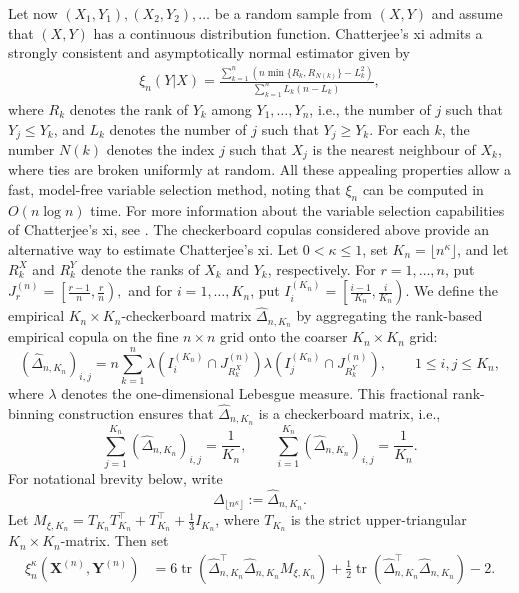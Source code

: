 \documentclass{article}
\theoremstyle{definition}
\DeclareMathOperator{\tr}{tr}  %
\newcommand{\bsX}{\boldsymbol{X}}
\newcommand{\bsY}{\boldsymbol{Y}}
\begin{document}
Let now $(X_1, Y_1), (X_2, Y_2), \ldots$ be a random sample from $(X,Y)$ and assume that $(X,Y)$ has a continuous distribution function.
Chatterjee's xi admits a strongly consistent and asymptotically normal estimator given by
\begin{align}\label{estTn}
    \xi_n(Y|X) = \frac{\sum_{k=1}^n (n \min\{R_k,R_{N(k)}\}-L_k^2)}{\sum_{k=1}^n L_k (n-L_k)},
\end{align}
where $R_k$ denotes the rank of $Y_k$ among $Y_1,\ldots,Y_n$, i.e., the number of $j$ such that $Y_j\leq Y_k$, and $L_k$ denotes the number of $j$ such that $Y_j\geq Y_k$.
For each $k$, the number $N(k)$ denotes the index $j$ such that $X_j$ is the nearest neighbour of $X_k$, where ties are broken uniformly at random.
All these appealing properties allow a fast, model-free variable selection method, noting that $\xi_n$ can be computed in $O(n\log n)$ time.
For more information about the variable selection capabilities of Chatterjee's xi, see \cite{chatterjee2021,huang2022kernel,ansari2024empirical}.
The checkerboard copulas considered above provide an alternative way to estimate Chatterjee's xi.
Let \(0<\kappa\le 1\), set \(K_n=\lfloor n^\kappa\rfloor\), and let \(R_k^X\) and \(R_k^Y\) denote the ranks of \(X_k\) and \(Y_k\), respectively.
For \(r=1,\ldots,n\), put
\(
    J_r^{(n)}=\left[\frac{r-1}{n},\frac{r}{n}\right),
\)
and for \(i=1,\ldots,K_n\), put
\(
    I_i^{(K_n)}=\left[\frac{i-1}{K_n},\frac{i}{K_n}\right).
\)
We define the empirical \(K_n\times K_n\)-checkerboard matrix \(\widehat\Delta_{n,K_n}\) by aggregating the rank-based empirical copula on the fine \(n\times n\) grid onto the coarser \(K_n\times K_n\) grid:
\[
    \left(\widehat\Delta_{n,K_n}\right)_{i,j}
    =
    n\sum_{k=1}^n
    \lambda\!\left(I_i^{(K_n)}\cap J_{R_k^X}^{(n)}\right)
    \lambda\!\left(I_j^{(K_n)}\cap J_{R_k^Y}^{(n)}\right),
    \qquad 1\le i,j\le K_n,
\]
where \(\lambda\) denotes the one-dimensional Lebesgue measure.
This fractional rank-binning construction ensures that \(\widehat\Delta_{n,K_n}\) is a checkerboard matrix, i.e.,
\[
    \sum_{j=1}^{K_n}\left(\widehat\Delta_{n,K_n}\right)_{i,j}
    =
    \frac1{K_n},
    \qquad
    \sum_{i=1}^{K_n}\left(\widehat\Delta_{n,K_n}\right)_{i,j}
    =
    \frac1{K_n}.
\]
For notational brevity below, write
\[
    \Delta_{\lfloor n^\kappa\rfloor}:=\widehat\Delta_{n,K_n}.
\]
Let \(M_{\xi,K_n}=T_{K_n}T_{K_n}^\top+T_{K_n}^\top+\tfrac13 I_{K_n}\), where \(T_{K_n}\) is the strict upper-triangular \(K_n\times K_n\)-matrix.
Then set
\begin{align}\label{eq:xi_estimator}
    \xi^{\kappa}_n(\bsX^{(n)}, \bsY^{(n)})
      &=
      6 \tr\left(
          \widehat\Delta_{n,K_n}^\top
          \widehat\Delta_{n,K_n}
          M_{\xi,K_n}
      \right)
      + \tfrac12 \tr\left(
          \widehat\Delta_{n,K_n}^\top
          \widehat\Delta_{n,K_n}
      \right)
      - 2 .
\end{align}
\end{document}
